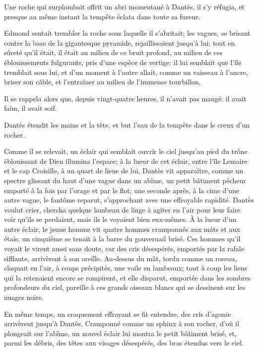 Une roche qui surplombait offrit un abri momentané à Dantès, il s'y réfugia, et presque au même instant la tempête éclata dans toute sa fureur.

Edmond sentait trembler la roche sous laquelle il s'abritait; les vagues, se brisant contre la base de la gigantesque pyramide, rejaillissaient jusqu'à lui; tout en sûreté qu'il était, il était au milieu de ce bruit profond, au milieu de ces éblouissements fulgurants, pris d'une espèce de vertige: il lui semblait que l'île tremblait sous lui, et d'un moment à l'autre allait, comme un vaisseau à l'ancre, briser son câble, et l'entraîner au milieu de l'immense tourbillon.

Il se rappela alors que, depuis vingt-quatre heures, il n'avait pas mangé: il avait faim, il avait soif.

Dantès étendit les mains et la tête, et but l'eau de la tempête dans le creux d'un rocher.

Comme il se relevait, un éclair qui semblait ouvrir le ciel jusqu'au pied du trône éblouissant de Dieu illumina l'espace; à la lueur de cet éclair, entre l'île Lemaire et le cap Croisille, à un quart de lieue de lui, Dantès vit apparaître, comme un spectre glissant du haut d'une vague dans un abîme, un petit bâtiment pêcheur emporté à la fois par l'orage et par le flot; une seconde après, à la cime d'une autre vague, le fantôme reparut, s'approchant avec une effroyable rapidité. Dantès voulut crier, chercha quelque lambeau de linge à agiter en l'air pour leur faire voir qu'ils se perdaient, mais ils le voyaient bien eux-mêmes. À la lueur d'un autre éclair, le jeune homme vit quatre hommes cramponnés aux mâts et aux étais; un cinquième se tenait à la barre du gouvernail brisé. Ces hommes qu'il voyait le virent aussi sans doute, car des cris désespérés, emportés par la rafale sifflante, arrivèrent à son oreille. Au-dessus du mât, tordu comme un roseau, claquait en l'air, à coups précipités, une voile en lambeaux; tout à coup les liens qui la retenaient encore se rompirent, et elle disparut, emportée dans les sombres profondeurs du ciel, pareille à ces grands oiseaux blancs qui se dessinent sur les nuages noirs.

En même temps, un craquement effrayant se fit entendre, des cris d'agonie arrivèrent jusqu'à Dantès. Cramponné comme un sphinx à son rocher, d'où il plongeait sur l'abîme, un nouvel éclair lui montra le petit bâtiment brisé, et, parmi les débris, des têtes aux visages désespérés, des bras étendus vers le ciel.

